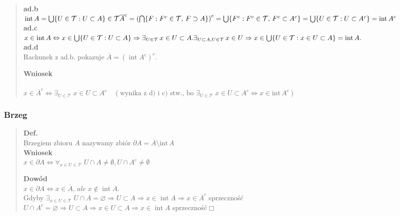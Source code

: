 \documentclass[10pt,a4paper]{article}
\begin{document}
{\begin{quote}
\begin{tcolorbox}[mybox]
    \textbf{ad.\;b}\\
    \( \operatorname{int}A = \bigcup \{ U \in \mathcal{T} : U \subset A \} \in \mathcal{T} \\
    \overline{A}^c = \left( \bigcap \{ F : F^c \in \mathcal{T},\, F \supset A \} \right)^c
    = \bigcup \{ F^c : F^c \in \mathcal{T},\, F^c \subset A^c \}
    = \bigcup \{ U \in \mathcal{T} : U \subset A^c \}
    = \operatorname{int}A^c \)\\

    \textbf{ad.\;c}\\
    \(x \in \operatorname{int}A \Leftrightarrow x \in \bigcup \{ U \in \mathcal{T} : U \subset A \} \Rightarrow \exists_{U \in \mathcal{T}}\, x \in U \subset A.\\
    \exists_{U \subset A, U \in \mathcal{T}}\, x \in U \Rightarrow x \in \bigcup \{ U \in \mathcal{T} : x \in U \subset A \} = \operatorname{int}A.\)\\

    \textbf{ad.\;d}\\
    Rachunek z ad.b. pokazuje \( \overline{A} = (\operatorname{int}A^c)^c. \)
    \end{tcolorbox}

    \textbf{Wniosek}\\\\
    $x \in \overline{A}^c \iff \exists_{U \in \mathcal{T}} \; x \in U \subset A^c \quad (\text{wynika z d) i c) stw., bo } \exists_{U \in \mathcal{T}} \; x \in U \subset A^c \iff x \in \mathrm{int}\, A^c)$
    \end{quote}

    \subsubsection*{Brzeg}
    \begin{quote}
    \textbf{Def.}\\ Brzegiem zbioru $A$ nazywamy zbiór $\partial A = \overline{A} \setminus \mathrm{int}\, A$\\

    \textbf{Wniosek}\\
    $x \in \partial A \iff \forall_{x \in U \in \mathcal{T}} \; U \cap A \neq \emptyset, U \cap A^c \neq \emptyset$\\

    \begin{tcolorbox}[mybox]
    \textbf{Dowód}\\ 
    \( x \in \partial A \Leftrightarrow x \in \overline{A},\, ale\; x \notin \operatorname{int}A. \)\\
    Gdyby \( \exists_{x \in U \in \mathcal{T}}\; U \cap A = \varnothing \Rightarrow U \subset A \Rightarrow x \in \operatorname{int}A \Rightarrow x \in \overline{A}^c \)\; sprzeczność\\
    \( U \cap A^c = \varnothing \Rightarrow U \subset A \Rightarrow x \in U \subset A \Rightarrow x \in \operatorname{int}A \)\; sprzeczność\;\(\Box\)
    \end{tcolorbox}
    \end{quote}

}
\end{document}

